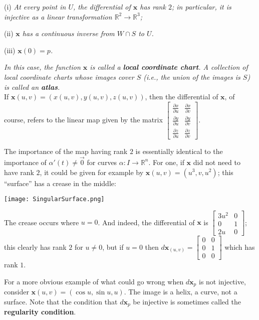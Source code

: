 \documentclass[leqno]{book}
\begin{document}
(i) \emph{At every point in $U$, the differential of $\mathbf x$ has rank $2$; in particular, it is injective as a linear transformation $\mathbb R^2\to\mathbb R^3$;}

(ii) \emph{$\mathbf x$ has a continuous inverse from $W\cap S$ to $U$.}

(iii) \emph{$\mathbf x(0)=p$.}

\emph{In this case, the function $\mathbf x$ is called a \textbf{local coordinate chart}.  A collection of local coordinate charts whose images cover $S$ (i.e., the union of the images is $S$) is called an \textbf{atlas}.}\\

\noindent If $\mathbf x(u,v)=(x(u,v),y(u,v),z(u,v))$, then the differential of $\mathbf x$, of course, refers to the linear map given by the matrix $\begin{bmatrix}\frac{\partial x}{\partial u}&\frac{\partial x}{\partial v}\\\frac{\partial y}{\partial u}&\frac{\partial y}{\partial v}\\\frac{\partial z}{\partial u}&\frac{\partial z}{\partial v}\end{bmatrix}$.

The importance of the map having rank $2$ is essentially identical to the importance of $\alpha'(t)\ne\vec 0$ for curves $\alpha:I\to\mathbb R^n$.  For one, if $\mathbf x$ did not need to have rank $2$, it could be given for example by $\mathbf x(u,v)=(u^3,v,u^2)$; this ``surface'' has a crease in the middle:
\begin{center}
\texttt{[image: SingularSurface.png]}
\end{center}
The crease occurs where $u=0$.  And indeed, the differential of $\mathbf x$ is $\begin{bmatrix}3u^2&0\\0&1\\2u&0\end{bmatrix}$; this clearly has rank $2$ for $u\ne 0$, but if $u=0$ then $d\mathbf x_{(u,v)}=\begin{bmatrix}0&0\\0&1\\0&0\end{bmatrix}$ which has rank $1$.

For a more obvious example of what could go wrong when $d\mathbf x_p$ is not injective, consider $\mathbf x(u,v)=(\cos u,\sin u,u)$.  The image is a helix, a curve, not a surface. %
Note that the condition that $d\mathbf x_p$ be injective is sometimes called the \textbf{regularity condition}.
\end{document}
